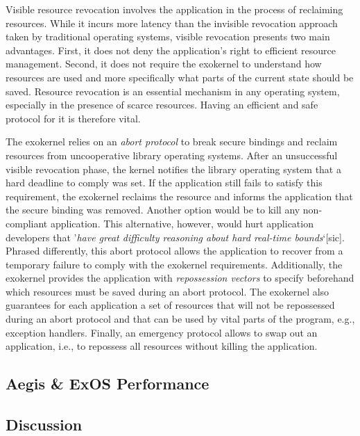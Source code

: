 Visible resource revocation involves the application in the process of reclaiming resources.
While it incurs more latency than the invisible revocation approach taken by traditional operating systems, visible revocation presents two main advantages.
First, it does not deny the application's right to efficient resource management.
Second, it does not require the exokernel to understand how resources are used and more specifically what parts of the current state should be saved.
Resource revocation is an essential mechanism in any operating system, especially in the presence of scarce resources.
Having an efficient and safe protocol for it is therefore vital.

The exokernel relies on an \emph{abort protocol} to break secure bindings and reclaim resources from uncooperative library operating systems.
After an unsuccessful visible revocation phase, the kernel notifies the library operating system that a hard deadline to comply was set.
If the application still fails to satisfy this requirement, the exokernel reclaims the resource and informs the application that the secure binding was removed.
Another option would be to kill any non-compliant application.
This alternative, however, would hurt application developers that '\textit{have great difficulty reasoning about hard real-time bounds}`[sic].
Phrased differently, this abort protocol allows the application to recover from a temporary failure to comply with the exokernel requirements.
Additionally, the exokernel provides the application with \emph{repossession vectors} to specify beforehand which resources must be saved during an abort protocol.
The exokernel also guarantees for each application a set of resources that will not be repossessed during an abort protocol and that can be used by vital parts of the program, e.g., exception handlers.
Finally, an emergency protocol allows to swap out an application, i.e., to repossess all resources without killing the application.

\subsection{Aegis \& ExOS Performance}



\subsection{Discussion}




